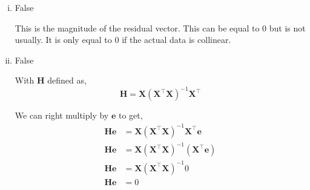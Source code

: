 \documentclass[12pt,letterpaper, onecolumn]{exam}
\begin{document}
\begin{questions}
\begin{solution}
\begin{enumerate}[a.)]
\begin{enumerate}[i.)]
            This will at least have a product which exists. Computing this, we get,
            \begin{equation*}
                \textbf{X}^\intercal\textbf{e} = \left [\begin{array}{ccccc}
                1 & 1 & 1 & 1 & 1 \\
                0 & 1 & 2 & 3 & 4
            \end{array} \right]\left[\begin{array}{c}
                0  \\
                0.2  \\
                -0.6  \\
                0.6  \\
                -0.2 
            \end{array} \right] = \left[\begin{array}{c}
                 0  \\  0                   
            \end{array} \right]
            \end{equation*}

            Geometrically, the fitted model is the best that can be achieved. There is still some residual and the amount left is not inside the span of $\textbf{X}$. The residual is orthogonal to the span of $\textbf{X}$ thus leaving the inner product 0.

            \item False

            This is the magnitude of the residual vector. This can be equal to 0 but is not usually. It is only equal to 0 if the actual data is collinear. 

            \item False

            With $\textbf{H}$ defined as,
            \begin{equation*}
                \textbf{H}=\textbf{X}(\textbf{X}^\intercal\textbf{X})^{-1}\textbf{X}^\intercal
            \end{equation*}

            We can right multiply by $\textbf{e}$ to get,
            \begin{align*}
                \textbf{He}& = \textbf{X}(\textbf{X}^\intercal\textbf{X})^{-1}\textbf{X}^\intercal\textbf{e} \\
                \textbf{He}& = \textbf{X}(\textbf{X}^\intercal\textbf{X})^{-1}(\textbf{X}^\intercal\textbf{e}) \\
                \textbf{He}& = \textbf{X}(\textbf{X}^\intercal\textbf{X})^{-1}0 \\ \textbf{He}&=0
            \end{align*}


\end{enumerate}
\end{enumerate}
\end{solution}
\end{questions}
\end{document}
